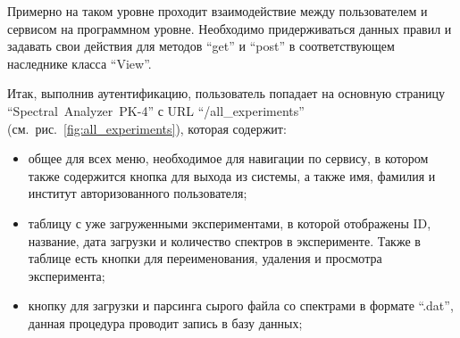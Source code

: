 Примерно на таком уровне проходит взаимодействие между пользователем и сервисом на программном уровне.
Необходимо придерживаться данных правил и задавать свои действия для методов “get” и “post” в соответствующем
наследнике класса “View”.

Итак, выполнив аутентификацию, пользователь попадает на основную страницу “Spectral~Analyzer~PK-4” с URL “/all\_experiments”
(см.~рис.~\ref{fig:all_experiments}), которая содержит:
\begin{itemize}
\item общее для всех меню, необходимое для навигации по сервису, в котором также содержится кнопка для выхода из системы,
а также имя, фамилия и институт авторизованного пользователя;
\item таблицу с уже загруженными экспериментами, в которой отображены ID, название, дата загрузки и количество спектров
в эксперименте. Также в таблице есть кнопки для переименования, удаления и просмотра эксперимента;
\item кнопку для загрузки и парсинга сырого файла со спектрами в формате “.dat”, данная процедура проводит запись в базу
данных;
\end{itemize}


